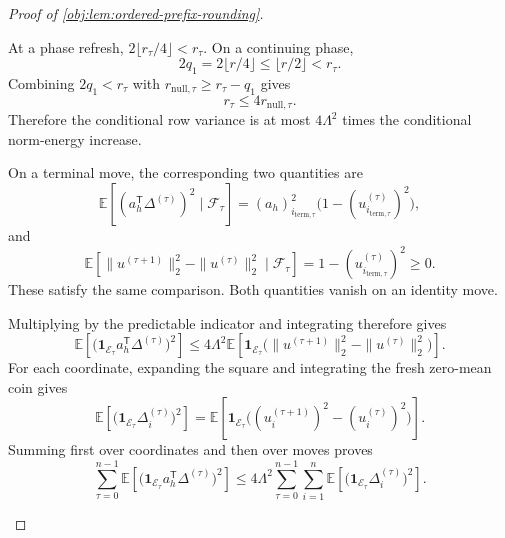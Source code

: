 \documentclass[11pt]{article}
\begin{document}
\begin{proof}[Proof of \cref{obj:lem:ordered-prefix-rounding}]
\begin{enumerate}
At a phase refresh,
\(2\lfloor r_\tau/4\rfloor<r_\tau\). On a continuing phase,
\[
2q_1=2\lfloor r/4\rfloor
\leq\lfloor r/2\rfloor<r_\tau.
\]
Combining \(2q_1<r_\tau\) with
\(r_{\mathrm{null},\tau}\geq r_\tau-q_1\) gives
\[
r_\tau\leq4r_{\mathrm{null},\tau}.
\]
Therefore the conditional row variance is at most \(4\Lambda^2\) times the conditional norm-energy increase.

On a terminal move, the corresponding two quantities are
\[
\mathbb E\!\left[(a_h^{\mathsf T}\Delta^{(\tau)})^2\mid\mathcal F_\tau\right]
=(a_h)_{i_{\mathrm{term},\tau}}^2
\bigl(1-(u_{i_{\mathrm{term},\tau}}^{(\tau)})^2\bigr),
\]
and
\[
\mathbb E\!\left[
\|u^{(\tau+1)}\|_2^2-\|u^{(\tau)}\|_2^2
\mid\mathcal F_\tau\right]
=1-(u_{i_{\mathrm{term},\tau}}^{(\tau)})^2\geq0.
\]
These satisfy the same comparison. Both quantities vanish on an identity move.

Multiplying by the predictable indicator and integrating therefore gives
\[
\mathbb E\!\left[
\bigl(\mathbf1_{\mathcal E_\tau}a_h^{\mathsf T}\Delta^{(\tau)}\bigr)^2
\right]
\leq
4\Lambda^2
\mathbb E\!\left[
\mathbf1_{\mathcal E_\tau}
\bigl(\|u^{(\tau+1)}\|_2^2-\|u^{(\tau)}\|_2^2\bigr)
\right].
\]
For each coordinate, expanding the square and integrating the fresh zero-mean coin gives
\[
\mathbb E\!\left[
\bigl(\mathbf1_{\mathcal E_\tau}\Delta_i^{(\tau)}\bigr)^2
\right]
=
\mathbb E\!\left[
\mathbf1_{\mathcal E_\tau}
\bigl((u_i^{(\tau+1)})^2-(u_i^{(\tau)})^2\bigr)
\right].
\]
Summing first over coordinates and then over moves proves
\[
\sum_{\tau=0}^{n-1}
\mathbb E\!\left[
\bigl(\mathbf1_{\mathcal E_\tau}a_h^{\mathsf T}\Delta^{(\tau)}\bigr)^2
\right]
\leq
4\Lambda^2
\sum_{\tau=0}^{n-1}\sum_{i=1}^n
\mathbb E\!\left[
\bigl(\mathbf1_{\mathcal E_\tau}\Delta_i^{(\tau)}\bigr)^2
\right].
\]


\end{enumerate}
\end{proof}
\end{document}
